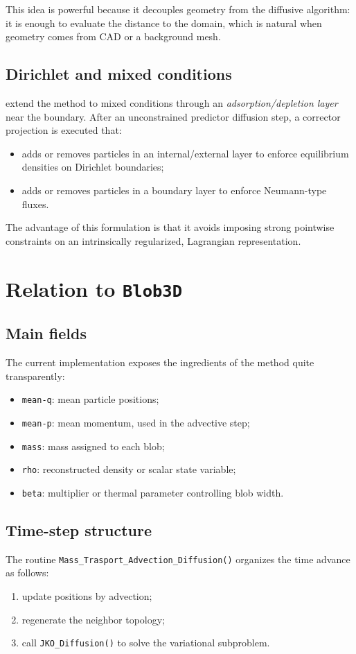 \documentclass[11pt,a4paper]{article}
\begin{document}
This idea is powerful because it decouples geometry from the diffusive algorithm: it is enough to evaluate the distance to the domain, which is natural when geometry comes from CAD or a background mesh.

\subsection{Dirichlet and mixed conditions}
\citet{pandolfi2025} extend the method to mixed conditions through an \emph{adsorption/depletion layer} near the boundary. After an unconstrained predictor diffusion step, a corrector projection is executed that:
\begin{itemize}[leftmargin=*]
  \item adds or removes particles in an internal/external layer to enforce equilibrium densities on Dirichlet boundaries;
  \item adds or removes particles in a boundary layer to enforce Neumann-type fluxes.
\end{itemize}

The advantage of this formulation is that it avoids imposing strong pointwise constraints on an intrinsically regularized, Lagrangian representation.

\section{Relation to \texttt{Blob3D}}
\subsection{Main fields}
The current implementation exposes the ingredients of the method quite transparently:
\begin{itemize}[leftmargin=*]
  \item \texttt{mean-q}: mean particle positions;
  \item \texttt{mean-p}: mean momentum, used in the advective step;
  \item \texttt{mass}: mass assigned to each blob;
  \item \texttt{rho}: reconstructed density or scalar state variable;
  \item \texttt{beta}: multiplier or thermal parameter controlling blob width.
\end{itemize}

\subsection{Time-step structure}
The routine \texttt{Mass\_Trasport\_Advection\_Diffusion()} organizes the time advance as follows:
\begin{enumerate}[label=\arabic*.]
  \item update positions by advection;
  \item regenerate the neighbor topology;
  \item call \texttt{JKO\_Diffusion()} to solve the variational subproblem.
\end{enumerate}
\end{document}
